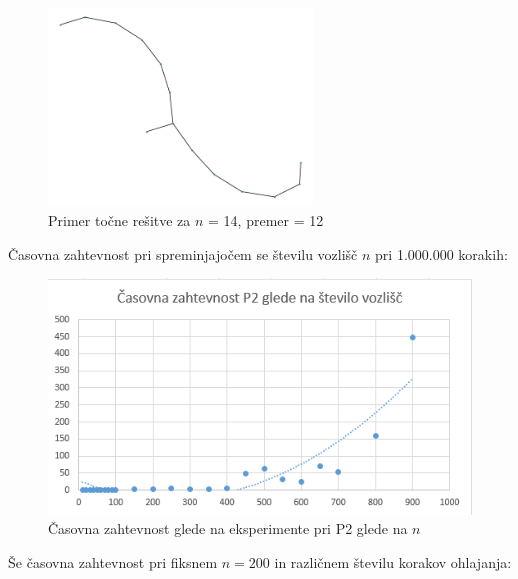\documentclass[a4paper, 12 pt]{article}
\begin{document}
\begin{figure}[H]
\centering
  \includegraphics[width=7cm]{drevo14diam12.png}
  \caption{Primer točne rešitve za $n$ = 14, premer = 12}
  \label{fig:graf1}
\end{figure}

\vspace{1cm}

Časovna zahtevnost pri spreminjajočem se številu vozlišč $n$ pri 1.000.000 korakih:

\begin{figure}[H]
\centering
  \includegraphics[width=12cm]{casovna_p2_n.png}
  \caption{Časovna zahtevnost glede na eksperimente pri P2 glede na $n$}
  \label{fig:p2_časovna_zaht_n} 
\end{figure}

\vspace{1cm}

Še časovna zahtevnost pri fiksnem $n = 200$ in različnem številu korakov ohlajanja:
\end{document}
